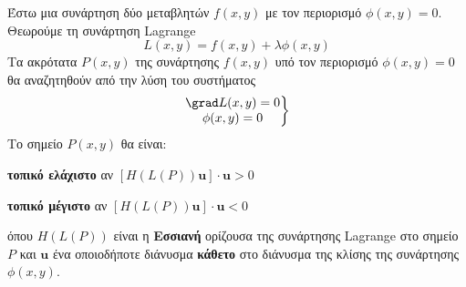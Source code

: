 \begin{thm}
  Έστω μια συνάρτηση δύο μεταβλητών $ f(x,y) $ με τον περιορισμό $ \phi (x,y) = 0 $. 
  Θεωρούμε τη συνάρτηση Lagrange 
  \[
    L(x,y) = f(x,y) + \lambda \phi (x,y) 
  \]
  Τα ακρότατα $ P(x,y) $ της συνάρτησης $ f(x,y) $ υπό τον περιορισμό $ \phi (x,y)=0 $  
  θα αναζητηθούν από την λύση του συστήματος 
  \[
    \left.
      \begin{matrix}
        \grad L(x,y)=0 \\
        \phi (x,y)=0
      \end{matrix} 
    \right\} 
  \]
  Το σημείο $ P(x,y) $ θα είναι: 
  \begin{myitemize}
    \item \textbf{τοπικό ελάχιστο} αν $ [H(L(P)) \mathbf{u}] \cdot \mathbf{u} > 0 $
    \item \textbf{τοπικό μέγιστο} αν $ [H(L(P)) \mathbf{u}] \cdot \mathbf{u} < 0 $
  \end{myitemize}
\end{thm}
όπου $ H(L(P)) $ είναι η \textbf{Εσσιανή} ορίζουσα της συνάρτησης Lagrange στο 
σημείο $P$ και $ \mathbf{u} $ ένα οποιοδήποτε διάνυσμα \textbf{κάθετο} στο διάνυσμα της 
κλίσης της συνάρτησης $ \phi(x,y) $.



